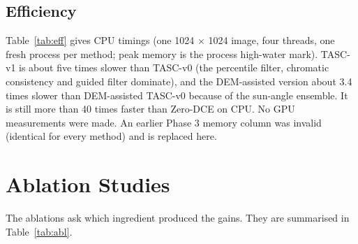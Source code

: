 \documentclass[conference]{IEEEtran}
\begin{document}
\subsection{Efficiency}
Table~\ref{tab:eff} gives CPU timings (one 1024 $\times$ 1024 image, four threads, one fresh process per method; peak memory is the process high-water mark). TASC-v1 is about five times slower than TASC-v0 (the percentile filter, chromatic consistency and guided filter dominate), and the DEM-assisted version about 3.4 times slower than DEM-assisted TASC-v0 because of the sun-angle ensemble. It is still more than 40 times faster than Zero-DCE on CPU. No GPU measurements were made. An earlier Phase 3 memory column was invalid (identical for every method) and is replaced here.

\begin{table}[t]
\caption{CPU runtime and peak memory, 1024 $\times$ 1024 image.}
\label{tab:eff}
\centering\scriptsize
\setlength{\tabcolsep}{2.5pt}
\end{table}
\section{Ablation Studies}
The ablations ask which ingredient produced the gains. They are summarised in Table~\ref{tab:abl}.
\end{document}

